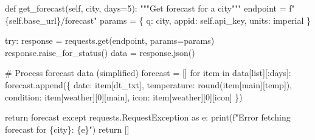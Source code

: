 \documentclass[
  letterpaper,
  DIV=11,
  numbers=noendperiod,
  oneside]{scrreprt}
\newenvironment{Shaded}{}{}
\newcommand{\BuiltInTok}[1]{\textcolor[rgb]{0.84,0.23,0.29}{#1}}
\newcommand{\CommentTok}[1]{\textcolor[rgb]{0.42,0.45,0.49}{#1}}
\newcommand{\ControlFlowTok}[1]{\textcolor[rgb]{0.84,0.23,0.29}{#1}}
\newcommand{\DecValTok}[1]{\textcolor[rgb]{0.00,0.36,0.77}{#1}}
\newcommand{\ImportTok}[1]{\textcolor[rgb]{0.01,0.18,0.38}{#1}}
\newcommand{\KeywordTok}[1]{\textcolor[rgb]{0.84,0.23,0.29}{#1}}
\newcommand{\NormalTok}[1]{\textcolor[rgb]{0.14,0.16,0.18}{#1}}
\newcommand{\OperatorTok}[1]{\textcolor[rgb]{0.14,0.16,0.18}{#1}}
\newcommand{\SpecialCharTok}[1]{\textcolor[rgb]{0.00,0.36,0.77}{#1}}
\newcommand{\SpecialStringTok}[1]{\textcolor[rgb]{0.01,0.18,0.38}{#1}}
\newcommand{\StringTok}[1]{\textcolor[rgb]{0.01,0.18,0.38}{#1}}
\newcommand{\VariableTok}[1]{\textcolor[rgb]{0.89,0.38,0.04}{#1}}
\begin{document}
\begin{Shaded}
\begin{Highlighting}[]
    \KeywordTok{def}\NormalTok{ get\_forecast(}\VariableTok{self}\NormalTok{, city, days}\OperatorTok{=}\DecValTok{5}\NormalTok{):}
        \CommentTok{"""Get forecast for a city"""}
\NormalTok{        endpoint }\OperatorTok{=} \SpecialStringTok{f"}\SpecialCharTok{\{}\VariableTok{self}\SpecialCharTok{.}\NormalTok{base\_url}\SpecialCharTok{\}}\SpecialStringTok{/forecast"}
\NormalTok{        params }\OperatorTok{=}\NormalTok{ \{}
            \StringTok{\textquotesingle{}q\textquotesingle{}}\NormalTok{: city,}
            \StringTok{\textquotesingle{}appid\textquotesingle{}}\NormalTok{: }\VariableTok{self}\NormalTok{.api\_key,}
            \StringTok{\textquotesingle{}units\textquotesingle{}}\NormalTok{: }\StringTok{\textquotesingle{}imperial\textquotesingle{}}
\NormalTok{        \}}
        
        \ControlFlowTok{try}\NormalTok{:}
\NormalTok{            response }\OperatorTok{=}\NormalTok{ requests.get(endpoint, params}\OperatorTok{=}\NormalTok{params)}
\NormalTok{            response.raise\_for\_status()}
\NormalTok{            data }\OperatorTok{=}\NormalTok{ response.json()}
            
            \CommentTok{\# Process forecast data (simplified)}
\NormalTok{            forecast }\OperatorTok{=}\NormalTok{ []}
            \ControlFlowTok{for}\NormalTok{ item }\KeywordTok{in}\NormalTok{ data[}\StringTok{\textquotesingle{}list\textquotesingle{}}\NormalTok{][:days]:}
\NormalTok{                forecast.append(\{}
                    \StringTok{\textquotesingle{}date\textquotesingle{}}\NormalTok{: item[}\StringTok{\textquotesingle{}dt\_txt\textquotesingle{}}\NormalTok{],}
                    \StringTok{\textquotesingle{}temperature\textquotesingle{}}\NormalTok{: }\BuiltInTok{round}\NormalTok{(item[}\StringTok{\textquotesingle{}main\textquotesingle{}}\NormalTok{][}\StringTok{\textquotesingle{}temp\textquotesingle{}}\NormalTok{]),}
                    \StringTok{\textquotesingle{}condition\textquotesingle{}}\NormalTok{: item[}\StringTok{\textquotesingle{}weather\textquotesingle{}}\NormalTok{][}\DecValTok{0}\NormalTok{][}\StringTok{\textquotesingle{}main\textquotesingle{}}\NormalTok{],}
                    \StringTok{\textquotesingle{}icon\textquotesingle{}}\NormalTok{: item[}\StringTok{\textquotesingle{}weather\textquotesingle{}}\NormalTok{][}\DecValTok{0}\NormalTok{][}\StringTok{\textquotesingle{}icon\textquotesingle{}}\NormalTok{]}
\NormalTok{                \})}
            
            \ControlFlowTok{return}\NormalTok{ forecast}
        \ControlFlowTok{except}\NormalTok{ requests.RequestException }\ImportTok{as}\NormalTok{ e:}
            \BuiltInTok{print}\NormalTok{(}\SpecialStringTok{f"Error fetching forecast for }\SpecialCharTok{\{}\NormalTok{city}\SpecialCharTok{\}}\SpecialStringTok{: }\SpecialCharTok{\{}\NormalTok{e}\SpecialCharTok{\}}\SpecialStringTok{"}\NormalTok{)}
            \ControlFlowTok{return}\NormalTok{ []}
\end{Highlighting}
\end{Shaded}
\end{document}
